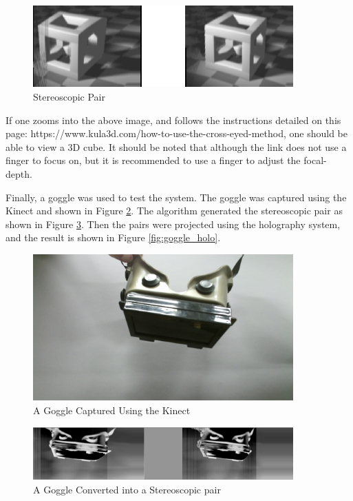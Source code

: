 \documentclass[12pt]{article}
\begin{document}
\begin{figure}
    \centering
    \includegraphics[width=100mm]{stereoscopic_pair.png}
    \caption{Stereoscopic Pair}
    \label{fig:stereosco}
\end{figure}

If one zooms into the above image, and follows the instructions detailed on this page: https://www.kula3d.com/how-to-use-the-cross-eyed-method, one should be able to view a 3D cube. It should be noted that although the link does not use a finger to focus on, but it is recommended to use a finger to adjust the focal-depth.

Finally, a goggle was used to test the system. The goggle was captured using the Kinect and shown in Figure \ref{fig:goggle}. The algorithm generated the stereoscopic pair as shown in Figure \ref{fig:goggle_stereo}. Then the pairs were projected using the holography system, and the result is shown in Figure \ref{fig:goggle_holo}.

\begin{figure}
    \centering
    \includegraphics[width=100mm]{goggles.png}
    \caption{A Goggle Captured Using the Kinect}
    \label{fig:goggle}
\end{figure}


\begin{figure}
    \centering
    \includegraphics[width=100mm]{goggle_stereoscopic.png}
    \caption{A Goggle Converted into a Stereoscopic pair}
    \label{fig:goggle_stereo}
\end{figure}
\end{document}
